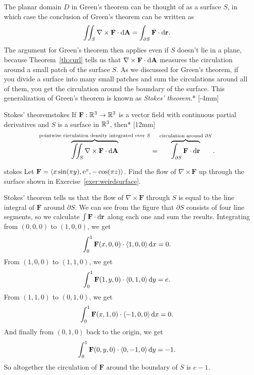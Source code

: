 \documentclass{watsonbook}
\begin{document}
The planar domain $D$ in Green's theorem can be thought of as a
surface $S$, in which case the conclusion of Green's theorem can be
written as
\[
  \iint_S \nabla \times \mathbf{F} \cdot
  \mathrm{d}\mathbf{A} =
  \int_{\partial S} \mathbf{F} \cdot
  \mathrm{d}\mathbf{r}. 
\]
The argument for Green's theorem then applies even if $S$ doesn't lie
in a plane, because Theorem~\ref{th:curl} tells us that
$\nabla \times \mathbf{F} \cdot \mathrm{d}\mathbf{A}$ measures the circulation
around a small patch of the surface $S$. As we discussed for Green's
theorem, if you divide a surface into many small patches and sum the
circulations around all of them, you get the circulation around the
boundary of the surface.  This generalization of Green's theorem is
known as \textit{Stokes' theorem}.* [-4mm]

\begin{theo}[left skip = 4.25 cm, width = \dimexpr \textwidth - 4.25
  cm \relax]{Stokes' theorem}{stokes}
  If $\mathbf{F} : \mathbb{R}^3 \to \mathbb{R}^3$ is a vector field with continuous
  partial derivatives and $S$ is a surface in $\mathbb{R}^3$, then*
  [12mm]
  \[
    \overbrace{\iint_S \nabla \times \mathbf{F} \cdot
      \mathrm{d}\mathbf{A}}^{\text{pointwise circulation density integrated
        over $S$}} =
    \overbrace{\int_{\partial S} \mathbf{F} \cdot
      \mathrm{d}\mathbf{r}}^{\text{circulation around $\partial S$}}. 
  \]
\end{theo}

\begin{example}{}{stokes}
  Let $\mathbf{F} = \langle x \sin (\pi y), \operatorname{e}^x, -\cos(\pi z)
  \rangle$. Find the flow of $\nabla \times \mathbf{F}$ up through the
  surface shown in Exercise~\ref{exer:weirdsurface}.
\end{example}

\begin{solution} 
  Stokes' theorem tells us that the flow of $\nabla \times \mathbf{F}$
  through $S$ is equal to the line integral of $\mathbf{F}$ around
  $\partial S$. We can see from the figure that $\partial S$ consists
  of four line segments, so we calculate
  $\int \mathbf{F} \cdot {\mathrm{d}}\mathbf{r}$ along each one and sum the
  results. Integrating from $(0,0,0)$ to $(1,0,0)$, we get
  \[
    \int_0^1\mathbf{F}(x,0,0) \cdot \langle 1, 0, 0 \rangle  \, \mathrm{d} x =
    0. 
  \]
  From $(1,0,0)$ to $(1,1,0)$, we get
  \[
    \int_0^1\mathbf{F}(1,y,0) \cdot \langle 0, 1, 0 \rangle  \, \mathrm{d} y =
    e. 
  \]
  From $(1,1,0)$ to $(0,1,0)$, we get
  \[
    \int_0^1\mathbf{F}(x,1,0) \cdot \langle -1, 0, 0 \rangle  \, \mathrm{d} x = 0. 
  \]
  And finally from $(0,1,0)$ back to the origin, we get
  \[
    \int_0^1\mathbf{F}(0,y,0) \cdot \langle 0, -1, 0 \rangle  \, \mathrm{d} y = -1. 
  \]
  So altogether the circulation of $\mathbf{F}$ around the boundary of
  $S$ is $\boxed{e-1}$. 
\end{solution}
\end{document}

